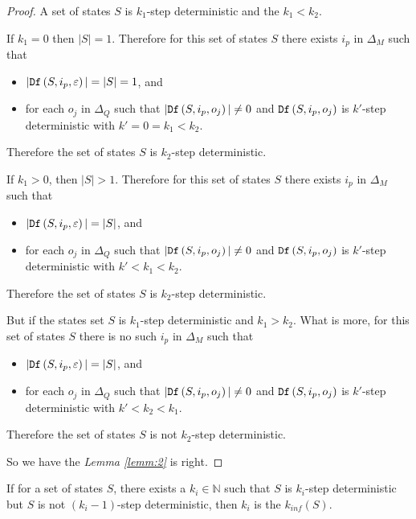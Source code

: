 \begin{proof}
 A set of states $S$ is $k_1$-step deterministic and the $k_1< k_2$. 
 
 If $k_1=0$ then $|S|=1$. Therefore for this set of states $S$ there exists $i_p$ in $\Delta_M$ such that
 \begin{itemize}
 \item  $|{\tt Df}\left(S,i_p,\varepsilon\right)|=|S|=1$, and 
 \item  for each $o_j$ in $\Delta_Q$ such that $|{\tt Df}\left(S,i_p,o_j\right)|\neq 0$ and ${\tt Df}\left(S,i_p,o_j\right)$ is $k'$-step deterministic with  ${k'}=0=k_1< k_2$.
 \end{itemize}
 Therefore the set of states $S$ is $k_2$-step deterministic.
 
 If $k_1>0$, then $|S|>1$. Therefore for this set of states $S$ there exists $i_p$ in $\Delta_M$ such that
 \begin{itemize}
 \item  $|{\tt Df}\left(S,i_p,\varepsilon\right)|=|S|$, and 
 \item  for each $o_j$ in $\Delta_Q$ such that $|{\tt Df}\left(S,i_p,o_j\right)|\neq 0$ and ${\tt Df}\left(S,i_p,o_j\right)$ is $k'$-step deterministic with  ${k'}<k_1< k_2$.
 \end{itemize}
 Therefore the set of states $S$ is $k_2$-step deterministic.

 But if the states set $S$ is $k_1$-step deterministic and $k_1> k_2$. What is more, for this set of states $S$ there is no such $i_p$ in $\Delta_M$ such that
 \begin{itemize}
 \item  $|{\tt Df}\left(S,i_p,\varepsilon\right)|=|S|$, and 
 \item  for each $o_j$ in $\Delta_Q$ such that $|{\tt Df}\left(S,i_p,o_j\right)|\neq 0$ and ${\tt Df}\left(S,i_p,o_j\right)$ is $k'$-step deterministic with  ${k'}<k_2<k_1$.
 \end{itemize}
 Therefore the set of states $S$ is not $k_2$-step deterministic.
 
 So we have the {\em Lemma \ref{lemm:2}} is right.
\end{proof}

\begin{definition}[$k_{inf}(S)$] 
If for a set of states $S$, there exists a $k_i\in \mathbb{N}$ such that $S$ is $k_i$-step deterministic but $S$ is not $(k_{i}-1)$-step deterministic, then $k_{i}$ is the $k_{inf}(S)$.
\end{definition}

